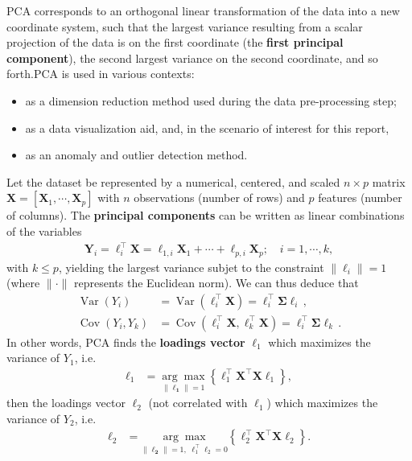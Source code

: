 PCA corresponds to an orthogonal linear transformation of the data into a new coordinate system, such that the largest variance resulting from a scalar projection of the data is on the first coordinate (the \textbf{first principal component}), the second largest variance on the second coordinate, and so forth.\newl PCA is used in various contexts:
\begin{itemize}[noitemsep]
    \item as a dimension reduction method used during the data pre-processing step;
    \item as a data visualization aid, and, in the scenario of interest for this report, 
    \item as an anomaly and outlier detection method.
\end{itemize}
Let the dataset be represented by a numerical, centered, and scaled $n\times p$ matrix $\textbf{X}=[\textbf{X}_1,\cdots,\textbf{X}_p]$ with $n$ observations (number of rows) and $p$ features (number of columns). The \textbf{principal components} can be written as linear combinations of the variables 
\begin{align*}
\textbf{Y}_i=\ell^{\!\top}_i\textbf{X}=\ell_{1,i}\textbf{X}_1+\cdots+\ell_{p,i}\textbf{X}_p;\quad i=1,\cdots,k,
\end{align*}
with $k\leq p$, yielding the largest variance subjet to the constraint $\|\ell_i\|=1$ (where $\|\cdot\| $ represents the Euclidean norm). We can thus deduce that  
\begin{align*}
\operatorname{Var}\left(Y_{i}\right) &=\operatorname{Var}\left(\ell_{i}^{\!\top} \boldsymbol{X}\right)=\ell_{i}^{\!\top} \boldsymbol{\Sigma} \ell_{i} \,,\\ 
\operatorname{Cov}\left(Y_{i}, Y_{k}\right) &=\operatorname{Cov}\left(\ell_{i}^{\!\top} \boldsymbol{X}, \ell_{k}^{\!\top} \boldsymbol{X}\right)=\ell_{i}^{\!\top} \boldsymbol{\Sigma} \ell_{k}\, .
\end{align*}
In other words, PCA finds the \textbf{loadings vector} $\ell_{1}$ which maximizes the variance of $Y_1$, i.e. 
\begin{align*}
\mathbf{\ell}_{1}&=\underset{\|\mathbf{\ell_1}\|=1}{\arg \max }\left\{\ell^{\!\top}_1\mathbf{X}^{\!\top} \mathbf{X} \ell_1\right\},
\end{align*}
then the loadings vector $\ell_2$ (not correlated with $\ell_1$) which maximizes the variance of $Y_2$, i.e.   
\begin{align*}
\mathbf{\ell}_{2}& =\underset{\|\mathbf{\ell_2}\|=1,\; \ell_{1}^{\!\top}\ell_{2} =0}{\arg \max }\left\{\ell^{\!\top}_2\mathbf{X}^{\!\top} \mathbf{X} \ell_2\right\}.
\end{align*}
